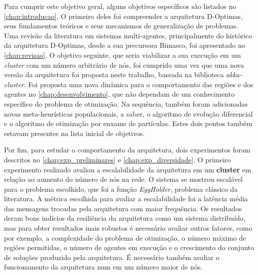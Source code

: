 Para cumprir este objetivo geral, alguns objetivos específicos são listados no \autoref{chap:introducao}. O primeiro deles foi compreender a arquitetura D-Optimas, seus fundamentos teóricos e seus mecanismos de generalização de problemas. Uma revisão da literatura em sistemas multi-agentes, principalmente do histórico da arquitetura D-Optimas, desde a sua precursora Bimasco, foi apresentado no \autoref{chap:revisao}. O objetivo seguinte, que seria viabilizar a sua execução em um \textit{cluster} com um número arbitrário de nós, foi cumprido uma vez que uma nova versão da arquitetura foi proposta neste trabalho, baseada na biblioteca \textit{akka-cluster}. Foi proposta uma nova dinâmica para o comportamento das regiões e dos agentes no \autoref{chap:desenvolvimento}, que não dependam de um conhecimento específico do problema de otimização. Na sequência, também foram adicionadas novas meta-heurísticas populacionais, a saber, o algoritmo de evolução diferencial e o algoritmo de otimização por enxame de partículas. Estes dois pontos também estavam presentes na lista inicial de objetivos. 

Por fim, para estudar o comportamento da arquitetura, dois experimentos foram descritos no \autoref{chap:exp_preliminares} e \autoref{chap:exp_diversidade}. O primeiro experimento realizado avaliou a escalabilidade da arquitetura em um \textbf{cluster} em relação ao aumento do número de nós na rede. O  sistema se mostrou escalável para o problema escolhido, que foi a função \textit{EggHolder}, problema clássico da literatura. A métrica escolhida para avaliar a escalabilidade foi a latência média das mensagens trocadas pela arquitetura com maior frequência. Os resultados deram bons indícios da resiliência da arquitetura como um sistema distribuído, mas para obter resultados mais robustos é necessário avaliar outros fatores, como por exemplo, a complexidade do problema de otimização, o número máximo de regiões permitidas, o número de agentes em execução e o crescimento do conjunto de soluções produzido pela arquitetura. É necessário também avaliar o funcionamento da arquitetura num em um número maior de nós. 

